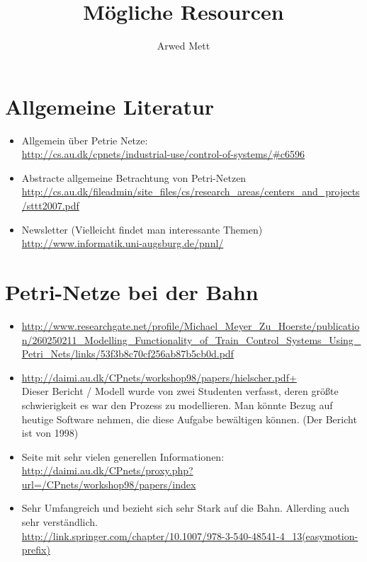 \documentclass{article}
\author{Arwed Mett}
\title{Mögliche Resourcen}
\begin{document}
\maketitle

\section{Allgemeine Literatur}
\begin{itemize}
    \item Allgemein über Petrie Netze:\\
        \url{http://cs.au.dk/cpnets/industrial-use/control-of-systems/#c6596}
    \item Abstracte allgemeine Betrachtung von Petri-Netzen\\
        \url{http://cs.au.dk/fileadmin/site_files/cs/research_areas/centers_and_projects/sttt2007.pdf}
    \item Newsletter (Vielleicht findet man interessante Themen)
        \url{http://www.informatik.uni-augsburg.de/pnnl/}
\end{itemize}

\section{Petri-Netze bei der Bahn}
\begin{itemize}
    \item \url{http://www.researchgate.net/profile/Michael_Meyer_Zu_Hoerste/publication/260250211_Modelling_Functionality_of_Train_Control_Systems_Using_Petri_Nets/links/53f3b8c70cf256ab87b5cb0d.pdf}
    \item \url{http://daimi.au.dk/CPnets/workshop98/papers/hielscher.pdf+}\\
        Dieser Bericht / Modell wurde von zwei Studenten verfasst, deren größte schwierigkeit es war den Prozess zu modellieren.
        Man könnte Bezug auf heutige Software nehmen, die diese Aufgabe bewältigen können. (Der Bericht ist von 1998)

    \item Seite mit sehr vielen generellen Informationen:\\
        \url{http://daimi.au.dk/CPnets/proxy.php?url=/CPnets/workshop98/papers/index}
    \item Sehr Umfangreich und bezieht sich sehr Stark auf die Bahn. Allerding auch sehr verständlich.\\
        \url{http://link.springer.com/chapter/10.1007/978-3-540-48541-4_13(easymotion-prefix)}
\end{itemize}
\end{document}
